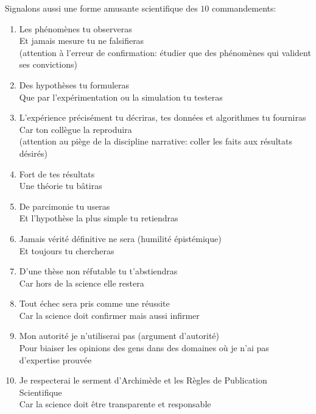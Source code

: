 Signalons aussi une forme amusante scientifique des $10$ commandements:
\begin{enumerate}
\item Les phénomènes tu observeras\\
Et jamais mesure tu ne falsifieras \\
(attention à l'erreur de confirmation: étudier que des phénomènes qui valident ses convictions)

\item Des hypothèses tu formuleras\\
Que par l'expérimentation ou la simulation tu testeras

\item L'expérience précisément tu décriras, tes données et algorithmes tu fourniras\\
Car ton collègue la reproduira\\
(attention au piège de la discipline narrative: coller les faits aux résultats désirés)

\item Fort de tes résultats\\
Une théorie tu bâtiras

\item De parcimonie tu useras\\
Et l'hypothèse la plus simple tu retiendras

\item Jamais vérité définitive ne sera (humilité épistémique)\\
Et toujours tu chercheras

\item D'une thèse non réfutable tu t'abstiendras\\
Car hors de la science elle restera

\item Tout échec sera pris comme une réussite\\
Car la science doit confirmer mais aussi infirmer

\item Mon autorité je n'utiliserai pas (argument d'autorité)\\
Pour biaiser les opinions des gens dans des domaines où je n'ai pas d'expertise prouvée

\item Je respecterai le serment d'Archimède et les Règles de Publication Scientifique\\
Car la science doit être transparente et responsable
\end{enumerate}

